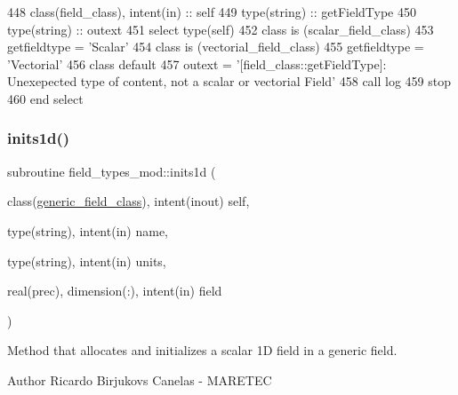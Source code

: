 \begin{DoxyCode}
448     \textcolor{keywordtype}{class}(field\_class), \textcolor{keywordtype}{intent(in)} :: self
449     \textcolor{keywordtype}{type}(string) :: getFieldType
450     \textcolor{keywordtype}{type}(string) :: outext
451     \textcolor{keywordflow}{select type}(self)
452 \textcolor{keywordflow}{    class is} (scalar\_field\_class)
453         getfieldtype = \textcolor{stringliteral}{'Scalar'}
454 \textcolor{keywordflow}{    class is} (vectorial\_field\_class)
455         getfieldtype = \textcolor{stringliteral}{'Vectorial'}
456 \textcolor{keywordflow}{        class default}
457         outext = \textcolor{stringliteral}{'[field\_class::getFieldType]: Unexepected type of content, not a scalar or vectorial
       Field'}
458         \textcolor{keyword}{call }log%
459         stop
460 \textcolor{keywordflow}{    end select}
\end{DoxyCode}
\mbox{\label{namespacefield__types__mod_ae4985a4f37aad76b5bd9d4fdbdec8ff3}} 
\subsubsection{\texorpdfstring{inits1d()}{inits1d()}}
{\footnotesize\ttfamily subroutine field\+\_\+types\+\_\+mod\+::inits1d (\begin{DoxyParamCaption}\item[{class(\mbox{\hyperlink{structfield__types__mod_1_1generic__field__class}{generic\+\_\+field\+\_\+class}}), intent(inout)}]{self,  }\item[{type(string), intent(in)}]{name,  }\item[{type(string), intent(in)}]{units,  }\item[{real(prec), dimension(\+:), intent(in)}]{field }\end{DoxyParamCaption})\hspace{0.3cm}{\ttfamily [private]}}



Method that allocates and initializes a scalar 1D field in a generic field. 

\begin{DoxyAuthor}{Author}
Ricardo Birjukovs Canelas -\/ M\+A\+R\+E\+T\+EC 
\end{DoxyAuthor}

